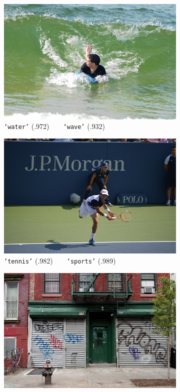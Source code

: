 {\begin{landscape}
\begin{figure}[th]
    \begin{subfigure}{.3\linewidth}
        \centering
        \includegraphics[width=.8\linewidth]{evolution-waves}
        \caption{\footnotesize \texttt{`water'} (.972)~~\ra{}~~\texttt{`wave'} (.932)}
    \end{subfigure}
    \hfill
    \begin{subfigure}{.3\linewidth}
        \centering
        \includegraphics[width=.8\linewidth]{evolution-tennis}
        \caption{\footnotesize \texttt{`tennis'} (.982)~~\ra{}~~\texttt{`sports'} (.989)}
    \end{subfigure}
    \hfill
    \begin{subfigure}{.3\linewidth}
        \centering
        \includegraphics[width=.8\linewidth]{evolution-neighbourhood}

\end{subfigure}
\end{figure}
\end{landscape}}

